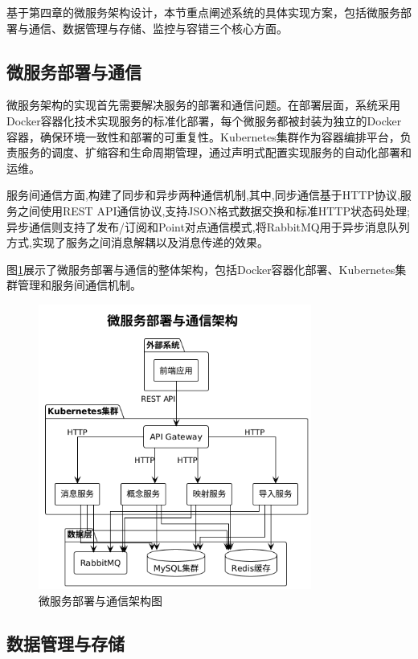 基于第四章的微服务架构设计，本节重点阐述系统的具体实现方案，包括微服务部署与通信、数据管理与存储、监控与容错三个核心方面。

\subsection{微服务部署与通信}

微服务架构的实现首先需要解决服务的部署和通信问题。在部署层面，系统采用Docker容器化技术实现服务的标准化部署，每个微服务都被封装为独立的Docker容器，确保环境一致性和部署的可重复性。Kubernetes集群作为容器编排平台，负责服务的调度、扩缩容和生命周期管理，通过声明式配置实现服务的自动化部署和运维。

服务间通信方面,构建了同步和异步两种通信机制,其中,同步通信基于HTTP协议,服务之间使用REST API通信协议,支持JSON格式数据交换和标准HTTP状态码处理;异步通信则支持了发布/订阅和Point对点通信模式,将RabbitMQ用于异步消息队列方式,实现了服务之间消息解耦以及消息传递的效果。

图\ref{fig:microservice_deployment}展示了微服务部署与通信的整体架构，包括Docker容器化部署、Kubernetes集群管理和服务间通信机制。

\begin{figure}[H]
    \centering
    \includegraphics[width=0.8\textwidth]{chapters/fig-0/microservice_deployment.png}
    \caption{微服务部署与通信架构图}
    \label{fig:microservice_deployment}
\end{figure}

\subsection{数据管理与存储}

